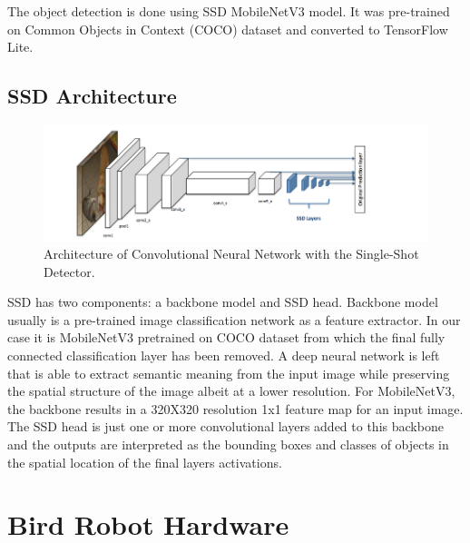 \documentclass[runningheads]{llncs}
\begin{document}
The object detection is done using SSD MobileNetV3 model. It was pre-trained on Common Objects in Context (COCO) dataset and converted to TensorFlow Lite.

\subsection{SSD Architecture} 

\begin{figure}[hbt!]
\includegraphics[width=\textwidth]{SSD_Mobilenet.png}
\caption{Architecture of Convolutional Neural Network with the Single-Shot Detector.} \label{fig1}
\end{figure}

SSD has two components: a backbone model and SSD head. Backbone model usually is a pre-trained image classification network as a feature extractor. In our case it is MobileNetV3 pretrained on  COCO dataset  from which the final fully connected classification layer has been removed. A deep neural network is left that is able to extract semantic meaning from the input image while preserving the spatial structure of the image albeit at a lower resolution. For MobileNetV3, the backbone results in a 320X320 resolution 1x1 feature map for an input image. The SSD head is just one or more convolutional layers added to this backbone and the outputs are interpreted as the bounding boxes and classes of objects in the spatial location of the final layers activations.\cite {ref_url2}


\section{Bird Robot Hardware}
\end{document}
